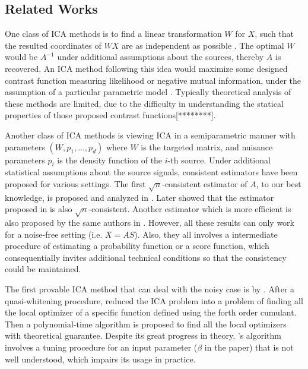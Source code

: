 \documentclass[twoside]{article}
\theoremstyle{definition}
\begin{document}
\subsection{Related Works}
\label{subsec:RelatedWorks}
One class of ICA methods is to find a linear transformation $W$ for $X$, such that the resulted coordinates of $WX$ are as independent as possible \citep{comon1994independent,HyvOja00}.
The optimal $W$ would be $A^{-1}$ under additional assumptions about the sources, thereby $A$ is recovered. 
An ICA method following this idea would maximize some designed contrast function measuring likelihood or negative mutual information, under the assumption of a particular parametric model \citep{comon1994independent,pham1997blind,lee1999independent,HyvOja00}. 
Typically theoretical analysis of these methods are limited, due to the difficulty in understanding the statical properties of those proposed contrast functions[********].  

Another class of ICA methods is viewing ICA in a semiparametric manner with parameters $(W, p_1, \ldots, p_d)$ where $W$ is the targeted matrix, and nuisance parameters $p_i$ is the density function of the $i$-th source. 
Under additional statistical assumptions about the source signals, consistent estimators have been proposed for various settings. The first  $\sqrt{n}$-consistent estimator of $A$, to our best knowledge, is proposed and analyzed in \citet{samarov2004nonparametric}.  
Later \citep{chen2005consistent} showed that the estimator proposed in \citet{eriksson2003characteristic} is also $\sqrt{n}$-consistent. Another estimator which is more efficient is also proposed by the same authors in \citep{chen2006efficient}.
However, all these results can only work for a noise-free setting (i.e. $X = AS$). 
Also, they all involves a intermediate procedure of estimating a probability function or a score function, which consequentially invites additional technical conditions so that the consistency could be maintained. 

The first provable ICA method that can deal with the noisy case is by \citep{arora2012provable}. After a quasi-whitening procedure, \citep{arora2012provable} reduced the ICA problem into a problem of finding all the local optimizer of a specific function defined using the forth order cumulant. Then a polynomial-time algorithm is proposed to find all the local optimizers with theoretical guarantee.
Despite its great progress in theory, \citep{arora2012provable}'s algorithm involves a tuning procedure for an input parameter ($\beta$ in the paper) that is not well understood, which impairs its usage in practice.
\end{document}
